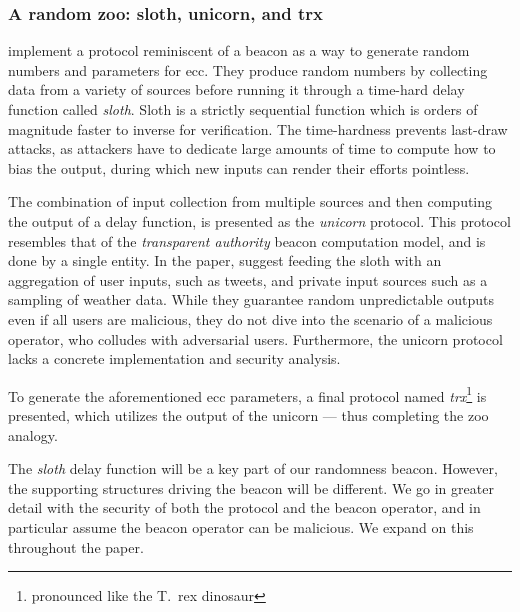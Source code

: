 \subsubsection{A random zoo: sloth, unicorn, and trx}%
\label{sub:random_zoo}
\citet{randomzoo} implement a protocol reminiscent of a beacon as a way to generate random numbers and parameters for \gls{ecc}.
They produce random numbers by collecting data from a variety of sources before running it through a time-hard delay function called \textit{sloth}.
Sloth is a strictly sequential function which is orders of magnitude faster to inverse for verification.
The time-hardness prevents last-draw attacks, as attackers have to dedicate large amounts of time to compute how to bias the output, during which new inputs can render their efforts pointless.

The combination of input collection from multiple sources and then computing the output of a delay function, is presented as the \textit{unicorn} protocol.
This protocol resembles that of the \emph{transparent authority} beacon computation model, and is done by a single entity.
In the paper, \citeauthor{randomzoo} suggest feeding the sloth with an aggregation of user inputs, such as tweets, and private input sources such as a sampling of weather data.
While they guarantee random unpredictable outputs even if all users are malicious, they do not dive into the scenario of a malicious operator, who colludes with adversarial users.
Furthermore, the unicorn protocol lacks a concrete implementation and security analysis.

To generate the aforementioned \gls{ecc} parameters, a final protocol named \textit{trx}\footnote{pronounced like the T.\ rex dinosaur} is presented, which utilizes the output of the unicorn --- thus completing the zoo analogy.

The \emph{sloth} delay function will be a key part of our randomness beacon.
However, the supporting structures driving the beacon will be different.
We go in greater detail with the security of both the protocol and the beacon operator, and in particular assume the beacon operator can be malicious.
We expand on this throughout the paper.

